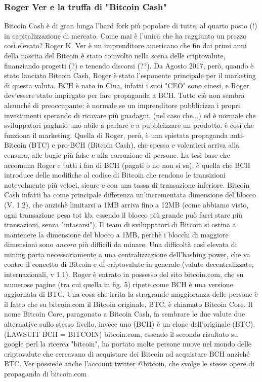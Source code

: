 \documentclass {article}
\begin{document}
{\subsubsection {Roger Ver e la truffa di "Bitcoin Cash"}


Bitcoin Cash è di gran lunga l'hard fork più popolare di tutte, al quarto posto (!) in capitalizzazione di mercato. Come mai è l'unica che ha raggiunto un prezzo così elevato?
Roger K. Ver è un imprenditore americano che fin dai primi anni della nascita del Bitcoin è stato coinvolto nella scena delle criptovalute, finanziando progetti (?) e tenendo discorsi (??).
Da Agosto 2017, però, quando è stato lanciato Bitcoin Cash, Roger è stato l'esponente principale per il marketing di questa valuta. BCH è nato in Cina, infatti i suoi "CEO" sono cinesi, e Roger dev'essere stato impiegato per fare propaganda a BCH.
Tutto ciò non sembra alcunché di preoccupante: è normale se un imprenditore pubblicizza i propri investimenti sperando di ricavare più guadagni, (nel caso che...) ed è normale che sviluppatori paghnio uno abile a parlare e a pubblcizzare un prodotto.
è così che funziona il marketing.
Quella di Roger, però, è una spietata propaganda anti-Bitcoin (BTC) e pro-BCH (Bitcoin Cash), che spesso e volentieri arriva alla censura, alle bugie più false e alla corruzione di persone.
La tesi base che accomuna Roger e tutti i fan di BCH (pagati o no non si sa), è quella che BCH introduce delle modifiche al codice di Bitcoin che rendono le transizioni notevolmente più veloci, sicure e con una tassa di transazione inferiore. Bitcoin Cash infatti ha come principale differenza un'incrementata dimensione del blocco (V. 1.2), che anzichè limitarsi a 1MB arriva fino a 12MB (come abbiamo visto, ogni transazione pesa tot kb. essendo il blocco più grande può farci stare più transazioni, senza "intasarsi").
Il team di sviluppatori di Bitcoin si ostina a mantenere la dimensione del blocco a 1MB, perchè i blocchi di maggiore dimensioni sono \emph{ancora} più difficili da minare.
Una difficoltà così elevata di mining porta necessariamente a una centralizzazione dell'hashing power, che va contro il concetto di Bitcoin e di criptovalute in generale (valute decentralizzate, internazionali, v 1.1).
Roger è entrato in possesso del sito bitcoin.com, che su numerose pagine (tra cui quella in fig. 5) ripete come BCH è una versione aggiornata di BTC. Una cosa che irrita la stragrande maggioranza delle persone è il fatto che su bitcoin.com il Bitcoin originale, BTC, è chiamato Bitcoin Core.
Il nome Bitcoin Core, paragonato a Bitcoin Cash, fa sembrare le due valute due alternative sullo stesso livello, invece uno (BCH) è un clone dell'originale (BTC). (LAWSUIT BCH = BITCOIN)
bitcoin.com, essendo il secondo risultato su google perl la ricerca "bitcoin", ha portato molte persone nuove nel mondo delle criptovalute che cercavano di acquistare dei Bitcoin ad acquistare BCH anziché BTC.
Ver possiede anche l'account twitter @bitcoin, che svolge le stesse opere di propaganda di bitcoin.com


}
\end{document}
